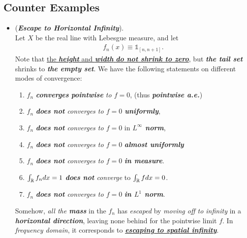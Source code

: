\documentclass[11pt]{article}
\begin{document}
\subsection{Counter Examples}
\begin{itemize}
\item \begin{example} (\emph{\textbf{Escape to Horizontal Infinity}}).\\
 Let $X$ be the real line with Lebesgue measure, and let 
\begin{align*}
f_n(x) \equiv \mathds{1}_{[n,n+1]}.
\end{align*}  Note that \underline{the \emph{\textbf{height}} and \emph{\textbf{width}} \emph{\textbf{do not shrink to zero}}}, but \emph{\textbf{the tail set}} shrinks to \emph{\textbf{the empty set}}. We have the following statements on different modes of convergence:
\begin{enumerate}
\item  $f_n$ \emph{\textbf{converges} \textbf{pointwise} to $f = 0$}, (thus \textbf{\emph{pointwise a.e.}})
\item  $f_n$ \emph{\textbf{does not} converges  to $f = 0$ \textbf{uniformly}},
\item  $f_n$ \emph{\textbf{does not} converges to $f = 0$} in \emph{\textbf{$L^{\infty}$ norm}}, 
\item  $f_n$ \emph{\textbf{does not} converges to $f = 0$} \emph{\textbf{almost uniformly}} 
\item $f_n$ \emph{\textbf{does not} converges to $f = 0$} \emph{\textbf{in measure}}.
\item $\int_{{\mathbb R}}f_{n} dx = 1$ \emph{\textbf{does not} converge} to $\int_{{\mathbb R}}f dx = 0$.
\item  $f_n$ \emph{\textbf{does not} converges to $f = 0$} \emph{\textbf{in $L^1$ norm}}. 
\end{enumerate} Somehow, \emph{all the \textbf{mass}} in the $f_n$ has \emph{escaped} by \emph{moving off to infinity} in a \emph{\textbf{horizontal direction}}, leaving none behind for the pointwise limit $f$. In \emph{frequency domain}, it corresponds to \emph{\textbf{\underline{escaping to spatial infinity}}}.  
\end{example}


\end{itemize}
\end{document}
